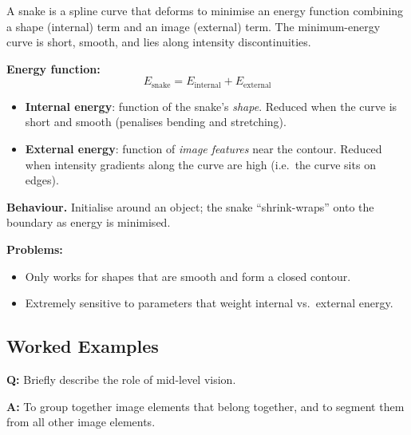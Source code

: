 \separator

\begin{defbox}
A snake is a spline curve that deforms to minimise an energy function combining a shape (internal) term and an image (external) term. The minimum-energy curve is short, smooth, and lies along intensity discontinuities.
\end{defbox}

\textbf{Energy function:}
\[
E_{\text{snake}} = E_{\text{internal}} + E_{\text{external}}
\]
\begin{itemize}
  \item \textbf{Internal energy}: function of the snake's \emph{shape}. Reduced when the curve is short and smooth (penalises bending and stretching).
  \item \textbf{External energy}: function of \emph{image features} near the contour. Reduced when intensity gradients along the curve are high (i.e.\ the curve sits on edges).
\end{itemize}

\textbf{Behaviour.} Initialise around an object; the snake ``shrink-wraps'' onto the boundary as energy is minimised.

\textbf{Problems:}
\begin{itemize}
  \item Only works for shapes that are smooth and form a closed contour.
  \item Extremely sensitive to parameters that weight internal vs.\ external energy.
\end{itemize}

\bigseparator

\subsection{Worked Examples}

\begin{exbox}
\textbf{Q:} Briefly describe the role of mid-level vision.

\textbf{A:} To group together image elements that belong together, and to segment them from all other image elements.
\end{exbox}


